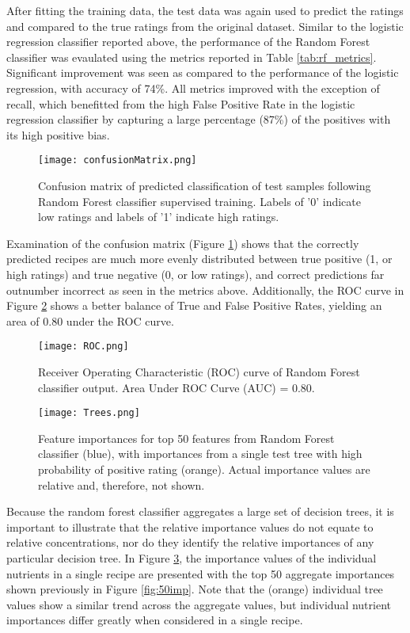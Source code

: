\documentclass[]{scrartcl}
\begin{document}
After fitting the training data, the test data was again used to predict the ratings and compared to the true ratings from the original dataset. Similar to the logistic regression classifier reported above, the performance of the Random Forest classifier was evaulated using the metrics reported in Table \ref{tab:rf_metrics}.  Significant improvement was seen as compared to the performance of the logistic regression, with accuracy of 74\%.  All metrics improved with the exception of recall, which benefitted from the high False Positive Rate in the logistic regression classifier by capturing a large percentage (87\%) of the positives with its high positive bias.

\begin{figure}
	\centering
	\texttt{[image: confusionMatrix.png]}
	\caption{Confusion matrix of predicted classification of test samples following Random Forest classifier supervised training. Labels of '0' indicate low ratings and labels of '1' indicate high ratings.\label{fig:CM}}
\end{figure}
Examination of the confusion matrix (Figure \ref{fig:CM}) shows that the correctly predicted recipes are much more evenly distributed between true positive (1, or high ratings) and true negative (0, or low ratings), and correct predictions far outnumber incorrect as seen in the metrics above.  Additionally, the ROC curve in Figure \ref{fig:ROC} shows a better balance of True and False Positive Rates, yielding an area of 0.80 under the ROC curve.
\begin{figure}
	\centering
	\texttt{[image: ROC.png]}
	\caption{Receiver Operating Characteristic (ROC) curve of Random Forest classifier output.  Area Under ROC Curve (AUC) = 0.80.\label{fig:ROC}}
\end{figure}

\begin{figure}
	\centering
	\texttt{[image: Trees.png]}
	\caption{Feature importances for top 50 features from Random Forest classifier (blue), with importances from a single test tree with high probability of positive rating (orange).  Actual importance values are relative and, therefore, not shown.\label{fig:Trees}}
\end{figure}

Because the random forest classifier aggregates a large set of decision trees, it is important to illustrate that the relative importance values do not equate to relative concentrations, nor do they identify the relative importances of any particular decision tree.  In Figure \ref{fig:Trees}, the importance values of the individual nutrients in a single recipe are presented with the top 50 aggregate importances shown previously in Figure \ref{fig:50imp}.  Note that the (orange) individual tree values show a similar trend across the aggregate values, but individual nutrient importances differ greatly when considered in a single recipe.
\end{document}

